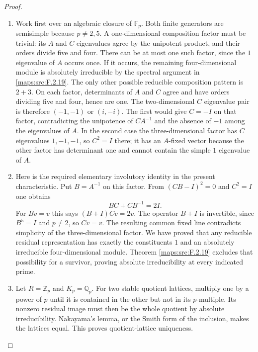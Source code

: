\begin{proof}
\begin{enumerate}[label=\arabic*.]
\item Work first over an algebraic closure of $\mathbb F_p$.
Both finite generators are semisimple because $p\ne2,5$.
A one-dimensional composition factor must be trivial:
its $A$ and $C$ eigenvalues agree by the unipotent product,
and their orders divide five and four.
There can be at most one such factor, since the $1$
eigenvalue of $A$ occurs once.
If it occurs, the remaining four-dimensional module is
absolutely irreducible by the spectral argument in \ref{maps:src:F.2.19}.
The only other possible reducible composition pattern is
$2+3$.
On each factor, determinants of $A$ and $C$ agree and
have orders dividing five and four, hence are one.
The two-dimensional $C$ eigenvalue pair is therefore
$(-1,-1)$ or $(i,-i)$.
The first would give $C=-I$ on that factor, contradicting
the unipotence of $CA^{-1}$ and the absence of $-1$
among the eigenvalues of $A$.
In the second case the three-dimensional factor has
$C$ eigenvalues $1,-1,-1$, so $C^2=I$ there; it has
an $A$-fixed vector because the other factor has determinant
one and cannot contain the simple $1$ eigenvalue of $A$.

\item Here is the required elementary involutory identity in the
present characteristic.  Put $B=A^{-1}$ on this factor.
From $(CB-I)^2=0$ and $C^2=I$ one obtains
\[
 BC+CB^{-1}=2I.
\]
For $Bv=v$ this says $(B+I)Cv=2v$.
The operator $B+I$ is invertible, since $B^5=I$ and
$p\ne2$, so $Cv=v$.  The resulting common fixed line
contradicts simplicity of the three-dimensional factor.
We have proved that any reducible residual representation
has exactly the constituents $1$ and an absolutely
irreducible four-dimensional module.  Theorem \ref{maps:src:F.2.19}
excludes that possibility for a survivor, proving absolute
irreducibility at every indicated prime.

\item Let $R=\mathbb Z_p$ and $K_p=\mathbb Q_p$.
For two stable quotient lattices, multiply one by a power
of $p$ until it is contained in the other but not in its
$p$-multiple.  Its nonzero residual image must then be the
whole quotient by absolute irreducibility.  Nakayama's
lemma, or the Smith form of the inclusion, makes the
lattices equal.  This proves quotient-lattice uniqueness.


\end{enumerate}
\end{proof}
